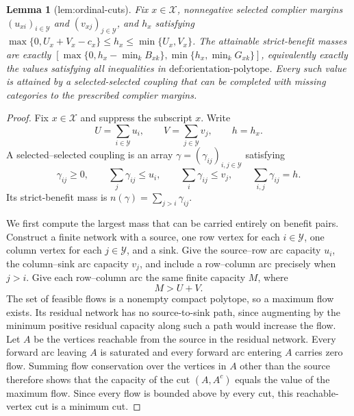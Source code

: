 \documentclass{article}
\newtheorem{lemma}{Lemma}
\begin{document}
\begin{lemma}[lem:ordinal-cuts]\label{lem:ordinal-cuts}
Fix \(x\in\mathcal X\), nonnegative selected complier margins \((u_{xi})_{i\in\mathcal Y}\) and \((v_{xj})_{j\in\mathcal Y}\), and \(h_x\) satisfying \(\max\{0,U_x+V_x-c_x\}\le h_x\le\min\{U_x,V_x\}\). The attainable strict-benefit masses are exactly \([\max\{0,h_x-\min_kB_{xk}\},\min\{h_x,\min_kG_{xk}\}]\), equivalently exactly the values satisfying all inequalities in \(\text{def:orientation-polytope}\). Every such value is attained by a selected-selected coupling that can be completed with missing categories to the prescribed complier margins.
\end{lemma}
\begin{proof}
Fix \(x\in\mathcal X\) and suppress the subscript \(x\).  Write
\[
 U=\sum_{i\in\mathcal Y}u_i,
 \qquad
 V=\sum_{j\in\mathcal Y}v_j,
 \qquad
 h=h_x.
\]
A selected--selected coupling is an array \(\gamma=(\gamma_{ij})_{i,j\in\mathcal Y}\) satisfying
\[
 \gamma_{ij}\geq0,
 \qquad
 \sum_j\gamma_{ij}\leq u_i,
 \qquad
 \sum_i\gamma_{ij}\leq v_j,
 \qquad
 \sum_{i,j}\gamma_{ij}=h.
\]
Its strict-benefit mass is \(n(\gamma)=\sum_{j>i}\gamma_{ij}\).

We first compute the largest mass that can be carried entirely on benefit pairs.  Construct a finite network with a source, one row vertex for each \(i\in\mathcal Y\), one column vertex for each \(j\in\mathcal Y\), and a sink.  Give the source--row arc capacity \(u_i\), the column--sink arc capacity \(v_j\), and include a row--column arc precisely when \(j>i\).  Give each row--column arc the same finite capacity \(M\), where
\[
 M>U+V.
\]
The set of feasible flows is a nonempty compact polytope, so a maximum flow exists.  Its residual network has no source-to-sink path, since augmenting by the minimum positive residual capacity along such a path would increase the flow.  Let \(A\) be the vertices reachable from the source in the residual network.  Every forward arc leaving \(A\) is saturated and every forward arc entering \(A\) carries zero flow.  Summing flow conservation over the vertices in \(A\) other than the source therefore shows that the capacity of the cut \((A,A^c)\) equals the value of the maximum flow.  Since every flow is bounded above by every cut, this reachable-vertex cut is a minimum cut.


\end{proof}
\end{document}
